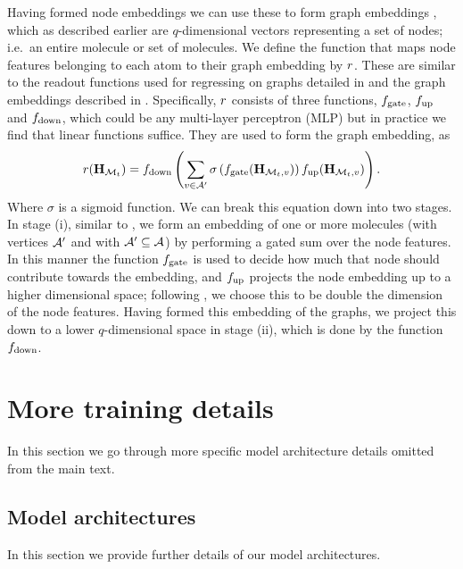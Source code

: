 Having formed node embeddings we can use these to form graph embeddings \citep{li2018learning,Johnson2017-pd}, which as described earlier are $q$-dimensional vectors representing a set of nodes; i.e.\ an entire molecule or set of molecules.
 We define the function that maps node features belonging to each atom to their graph embedding by $r$.
These are similar to the readout functions used for regressing on graphs detailed in \citep[Eq. 3]{gilmer2017neural} and the graph embeddings described in \citet[\S B.1]{li2018learning}. 
Specifically, $r$ consists of three functions, $f_\textrm{gate}$, $f_\textrm{up}$ and $f_\textrm{down}$, which could be any multi-layer perceptron (MLP) but in practice we find that linear functions suffice.
They are used to form the graph embedding, as
\begin{align}
	r({\mathbf{H}}_{{\mathcal{M}}_t}) = f_\textrm{down}\left(\sum_{v \in {\mathcal{A}}'} \sigma\left(f_\textrm{gate}({\mathbf{H}}_{{\mathcal{M}}_t,v})\right) f_\textrm{up}({\mathbf{H}}_{{\mathcal{M}}_t, v})\right).
	\label{eq:graph-embedding}
\end{align}
Where $\sigma$ is a sigmoid function.
We can break this equation down into two stages.
In stage (i), similar to \citet[\S B.1]{li2018learning}, we form an embedding of one or more molecules (with vertices ${\mathcal{A}}'$ and with ${\mathcal{A}}' \subseteq  {\mathcal{A}}$) by performing a gated sum over the node features. 
In this manner the function $f_\textrm{gate}$ is used to decide how much that node should contribute towards the embedding,
 and $f_\textrm{up}$ projects the node embedding up to a higher dimensional space; following \citet[\S B.1]{li2018learning}, we choose this to be double the dimension of the node features.
Having formed this embedding of the graphs, we project this down to a lower $q$-dimensional space in stage (ii), which is done by the function $f_\textrm{down}$. 







\section{More training details}

In this section we go through more specific model architecture details omitted from the main text. 

\subsection{Model architectures}
In this section we provide further details of our model architectures.

